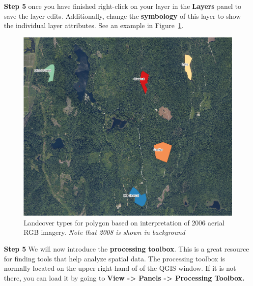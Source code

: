 \documentclass[
  letterpaper,
]{book}
\begin{document}
\textbf{Step 5} once you have finished right-click on your layer in the
\textbf{Layers} panel to save the layer edits. Additionally, change the
\textbf{symbology} of this layer to show the individual layer
attributes. See an example in Figure~\ref{fig-1}.

\begin{figure}

{\centering \includegraphics[width=5.75in,height=\textheight]{images/clipboard-1582844239.png}

}

\caption{\label{fig-1}Landcover types for polygon based on
interpretation of 2006 aerial RGB imagery. \emph{Note that 2008 is shown
in background}}

\end{figure}

\textbf{Step 5} We will now introduce the \textbf{processing toolbox}.
This is a great resource for finding tools that help analyze spatial
data. The processing toolbox is normally located on the upper right-hand
of of the QGIS window. If it is not there, you can load it by going to
\textbf{View -\textgreater{} Panels -\textgreater{} Processing Toolbox.}
\end{document}
